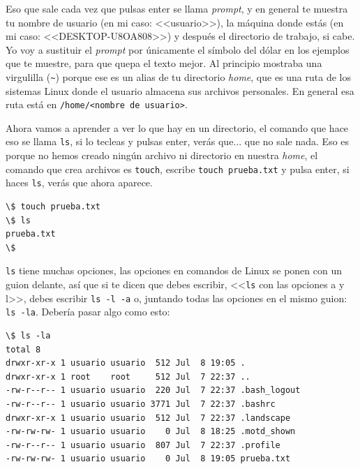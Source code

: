 \documentclass[a4paper]{article}
\begin{document}
Eso que sale cada vez que pulsas enter se llama \textit{prompt}, y en general
te muestra tu nombre de usuario (en mi caso: <<usuario>>), la máquina donde
estás (en mi caso: <<DESKTOP-U8OA808>>) y después el directorio de trabajo, si
cabe. Yo voy a sustituir el \textit{prompt} por únicamente
el símbolo del dólar en
los ejemplos que te muestre, para que quepa el texto mejor.
Al principio mostraba una virgulilla (\verb!~!) porque ese es un alias de tu
directorio \textit{home}, que es una ruta de los sistemas Linux donde el usuario
almacena sus archivos personales. En general esa ruta está en
\verb!/home/<nombre de usuario>!.

Ahora vamos a aprender a ver lo que hay en un directorio, el comando que hace
eso se llama \verb!ls!, si lo tecleas y pulsas enter, verás que... que no sale
nada. Eso es porque no hemos creado ningún archivo ni directorio en nuestra
\emph{home}, el comando que crea archivos es \verb!touch!, escribe
\verb!touch prueba.txt! y pulsa enter, si haces \verb!ls!, verás que ahora
aparece.


\noindent
\begin{minipage}[H]{\linewidth}
\mbox{}
\begin{lstlisting}[style=terminalStyle]
\$ touch prueba.txt
\$ ls
prueba.txt
\$
\end{lstlisting}
\end{minipage}

\verb!ls! tiene muchas opciones, las opciones en comandos de Linux se ponen
con un guion delante, así que si te dicen que debes escribir, <<\verb!ls!
con las opciones a y l>>, debes escribir \verb!ls -l -a! o, juntando todas
las opciones en el mismo guion: \verb!ls -la!. Debería pasar algo como esto:

\noindent
\begin{minipage}[H]{\linewidth}
\mbox{}
\begin{lstlisting}[style=terminalStyle]
\$ ls -la
total 8
drwxr-xr-x 1 usuario usuario  512 Jul  8 19:05 .
drwxr-xr-x 1 root    root     512 Jul  7 22:37 ..
-rw-r--r-- 1 usuario usuario  220 Jul  7 22:37 .bash_logout
-rw-r--r-- 1 usuario usuario 3771 Jul  7 22:37 .bashrc
drwxr-xr-x 1 usuario usuario  512 Jul  7 22:37 .landscape
-rw-rw-rw- 1 usuario usuario    0 Jul  8 18:25 .motd_shown
-rw-r--r-- 1 usuario usuario  807 Jul  7 22:37 .profile
-rw-rw-rw- 1 usuario usuario    0 Jul  8 19:05 prueba.txt
\end{lstlisting}
\end{minipage}
\end{document}
